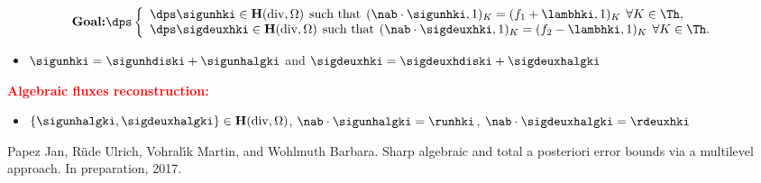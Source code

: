 \documentclass[10 pt]{beamer}
\renewcommand{\div}{\mathrm{div}}
\begin{document}
\begin{frame}
\vspace{-0.3 cm}
\normalsize
\begin{equation*}
\mbox{\textbf{Goal:}}\dps
\left\lbrace\begin{array}{llccc}
\dps \sigunhki \in \textbf H(\div,\Omega) \hspace{0.15 cm} \mbox{such that} \hspace{0.15 cm} (\nab \cdot \sigunhki,1)_K=(f_1+\lambhki,1)_K \hspace{0.15 cm} \forall K \in \Th, \\
\dps\sigdeuxhki \in \textbf H(\div,\Omega) \hspace{0.15 cm} \mbox{such that} \hspace{0.15 cm} (\nab \cdot \sigdeuxhki,1)_K=(f_2-\lambhki,1)_K \hspace{0.15 cm} \forall K \in \Th .
\end{array}
\right.
\end{equation*}
\normalsize
\begin{itemize}
\item 
$\sigunhki = \sigunhdiski + \sigunhalgki$ and $\sigdeuxhki = \sigdeuxhdiski + \sigdeuxhalgki$
\end{itemize}

\vspace{0.3 cm}
\textcolor{red}{\textbf{Algebraic fluxes reconstruction:}}
\begin{itemize}

\item $\left\{\sigunhalgki,\sigdeuxhalgki\right\} \in \textbf H(\div,\Omega)$, \: $\nab \cdot \sigunhalgki=\runhki$, \: $\nab \cdot \sigdeuxhalgki=\rdeuxhki$
\end{itemize}



\scriptsize
\begin{thebibliography}{10}
Papez Jan, Rüde Ulrich, Vohral{\'{\i}}k Martin, and Wohlmuth Barbara.
\newblock Sharp algebraic and total a posteriori error bounds via a multilevel
approach.
\newblock In preparation, 2017.
\end{thebibliography}
\end{frame}
\end{document}
